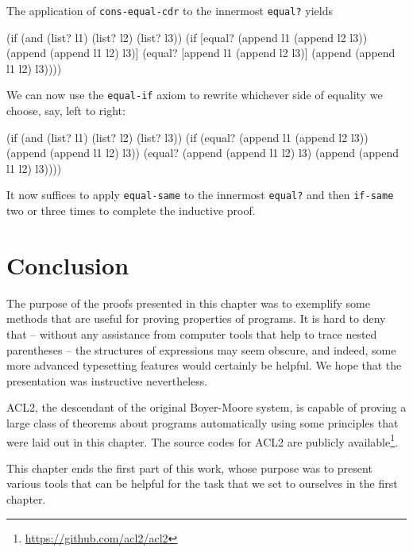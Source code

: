 The application of \texttt{cons-equal-cdr} to the innermost \texttt{equal?}
yields

\begin{Snippet}
  (if (and (list? l1) (list? l2) (list? l3))
      (if [equal? (append l1 (append l2 l3))
                  (append (append l1 l2) l3)]
          (equal? [append l1 (append l2 l3)]
                  (append (append l1 l2) l3))))
\end{Snippet}

We can now use the \texttt{equal-if} axiom to rewrite whichever side
of equality we choose, say, left to right:

\begin{Snippet}
  (if (and (list? l1) (list? l2) (list? l3))
      (if (equal? (append l1 (append l2 l3))
                  (append (append l1 l2) l3))
          (equal? (append (append l1 l2) l3)
                  (append (append l1 l2) l3))))
\end{Snippet}

It now suffices to apply \texttt{equal-same} to the innermost
\texttt{equal?}\,\,and then \texttt{if-same} two or three times
to complete the inductive proof.

\section{Conclusion}

The purpose of the proofs presented in this chapter was
to exemplify some methods that are useful for proving properties
of programs. It is hard to deny that -- without any assistance from
computer tools that help to trace nested parentheses -- the structures
of expressions may seem obscure, and indeed, some more advanced typesetting
features would certainly be helpful. We hope that the presentation
was instructive nevertheless.

ACL2, the descendant of the original Boyer-Moore system,
is capable of proving a large class of theorems about programs automatically
using some principles that were laid out in this chapter. The source
codes for ACL2 are publicly
available\footnote{\url{https://github.com/acl2/acl2}}.

This chapter ends the first part of this work, whose purpose was
to present various tools that can be helpful for the task that
we set to ourselves in the first chapter.
